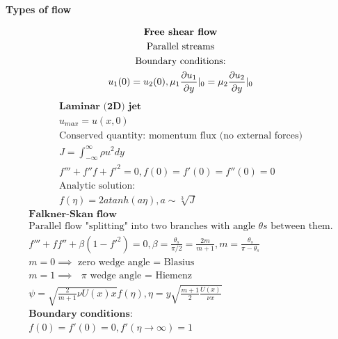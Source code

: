 \documentclass[10pt, a4paper]{article}
\newcommand{\derivative}[2]{\frac{\partial #1}{\partial #2}}
\begin{document}
\begin{center}
    \Large
    \textbf{Types of flow}
    \vspace{0.5cm}
\end{center}
\begin{multicols*}{2}
    \begin{gather*}
        \textbf{Free shear flow} \\
        \text{Parallel streams} \\
        \text{Boundary conditions:} \\
        u_{1}(0) = u_{2}(0), \mu_{1}\derivative{u_{1}}{y}\arrowvert_{0} = \mu_{2}\derivative{u_{2}}{y}\arrowvert_{0}
    \end{gather*}
    \begin{gather*}
        \textbf{Laminar (2D) jet} \\
        u_{max} = u(x,0) \\
        \text{Conserved quantity: momentum flux (no external forces)} \\
        J = \int_{-\infty}^{\infty}\rho u^{2}dy \\
        f''' + f''f + f'^{2} = 0, f(0) = f'(0) = f''(0) = 0 \\
        \text{Analytic solution: } \\
        f(\eta) = 2a tanh(a\eta), a\sim\sqrt[3]{J}
    \end{gather*}
    \begin{gather*}
        \textbf{Falkner-Skan flow} \\
        \text{Parallel flow "splitting" into two branches with angle $\theta{s}$ between them.} \\
        f''' + ff'' + \beta(1 - f'^{2}) = 0, \beta = \frac{\theta_s}{\pi/2} = \frac{2m}{m + 1}, m = \frac{\theta_s}{\pi - \theta_s} \\
        m = 0 \implies \text{ zero wedge angle = Blasius} \\
        m = 1 \implies \text{ $\pi$ wedge angle = Hiemenz} \\
        \psi = \sqrt{\frac{2}{m+1} \nu U(x) x}f(\eta), \eta = y \sqrt{\frac{m+1}{2}\frac{U(x)}{\nu x}} \\
        \textbf{Boundary conditions:} \\
        f(0) = f'(0) = 0, f'(\eta \rightarrow \infty) = 1 \\
    \end{gather*}
\end{multicols*}
\end{document}
